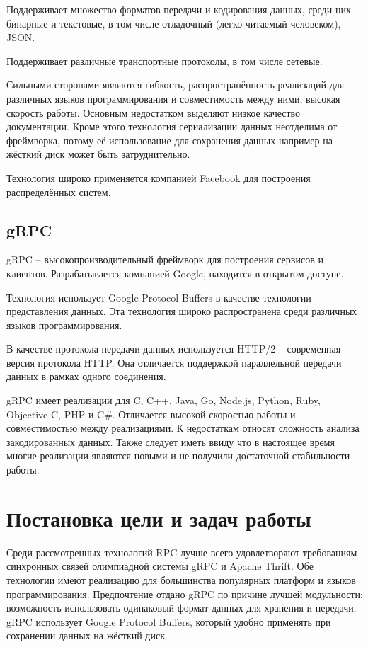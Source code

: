 Поддерживает множество форматов передачи и кодирования данных, среди них
бинарные и текстовые, в том числе отладочный (легко читаемый человеком), JSON.

Поддерживает различные транспортные протоколы, в том числе сетевые.

Сильными сторонами являются гибкость, распространённость реализаций
для различных языков программирования и совместимость между ними, высокая
скорость работы.
Основным недостатком выделяют низкое качество документации.
Кроме этого технология сериализации данных неотделима от фреймворка,
потому её использование для сохранения данных например на жёсткий диск
может быть затруднительно.

Технология широко применяется компанией Facebook для построения распределённых
систем.

\subsection{gRPC}
gRPC -- высокопроизводительный фреймворк для построения сервисов и клиентов.
Разрабатывается компанией Google, находится в открытом доступе.

Технология использует Google Protocol Buffers в качестве технологии
представления данных. Эта технология широко распространена среди
различных языков программирования.

В качестве протокола передачи данных используется HTTP/2 -- современная
версия протокола HTTP. Она отличается поддержкой параллельной передачи
данных в рамках одного соединения.

gRPC имеет реализации для C, C++, Java, Go, Node.js, Python, Ruby, Objective-C,
PHP и C\#. Отличается высокой скоростью работы и совместимостью между
реализациями. К недостаткам относят сложность анализа закодированных данных.
Также следует иметь ввиду что в настоящее время многие реализации являются
новыми и не получили достаточной стабильности работы.

\section{Постановка цели и задач работы}
Среди рассмотренных технологий RPC лучше всего удовлетворяют требованиям
синхронных связей олимпиадной системы gRPC и Apache Thrift. Обе технологии
имеют реализацию для большинства популярных платформ и языков программирования.
Предпочтение отдано gRPC по причине лучшей модульности: возможность
использовать одинаковый формат данных для хранения и передачи. gRPC
использует Google Protocol Buffers, который удобно применять при сохранении
данных на жёсткий диск.

